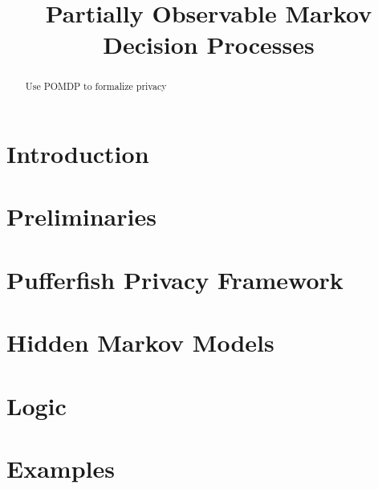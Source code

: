 \documentclass{llncs}
\title{Partially Observable Markov Decision Processes}
\begin{document}
\maketitle

\begin{abstract}
  Use POMDP to formalize privacy
\end{abstract}

\section{Introduction}
\label{section:introduction}


\section{Preliminaries}
\label{section:preliminaries}


\section{Pufferfish Privacy Framework}
\label{section:pufferfish}


\section{Hidden Markov Models}



\section{Logic}
\label{section:logic}


\section{Examples}
\label{section:examples}




\end{document}
